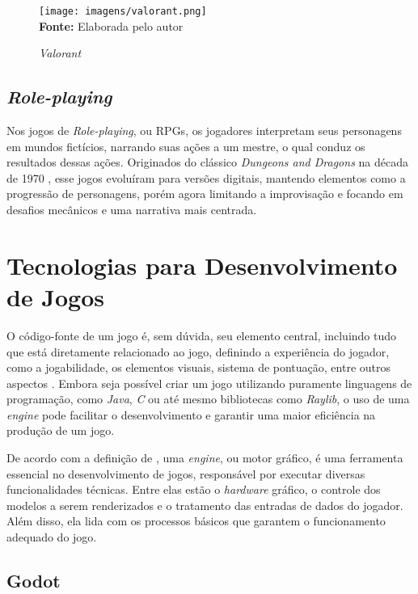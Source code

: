 \FloatBarrier 
\begin{figure}[!htbp]
	\centering
	\caption{\textit{Valorant}}
	\texttt{[image: imagens/valorant.png]}
	\\\textbf{Fonte:} Elaborada pelo autor
	
	\label{fig:vava}
\end{figure}
\FloatBarrier


\subsection{\textit{Role-playing}}

Nos jogos de \textit{Role-playing}, ou RPGs, os jogadores interpretam seus personagens em mundos fictícios, narrando suas ações a um mestre, o qual conduz os resultados dessas ações. Originados do clássico  \textit{Dungeons and Dragons} na década de 1970 \cite{Mason2004}, esse jogos evoluíram para versões digitais, mantendo elementos como a progressão de personagens, porém agora limitando a improvisação e focando em desafios mecânicos e uma narrativa mais centrada.

\section{Tecnologias para Desenvolvimento de Jogos} 

O código-fonte de um jogo é, sem dúvida, seu elemento central, incluindo tudo que está diretamente relacionado ao jogo, definindo a experiência do jogador, como a jogabilidade, os elementos visuais, sistema de pontuação, entre outros aspectos \cite{Rabin2021}. Embora seja possível criar um jogo utilizando puramente linguagens de programação, como \textit{Java}, \textit{C} ou até mesmo bibliotecas como \textit{Raylib}, o uso de uma \textit{engine} pode facilitar o desenvolvimento e garantir uma maior eficiência na produção de um jogo.

De acordo com a definição de , uma \textit{engine}, ou motor gráfico, é uma ferramenta essencial no desenvolvimento de jogos, responsável por executar diversas funcionalidades técnicas. Entre elas estão o \textit{hardware} gráfico, o controle dos modelos a serem renderizados e o tratamento das entradas de dados do jogador. Além disso, ela lida com os processos básicos que garantem o funcionamento adequado do jogo. 

\subsection{Godot}

